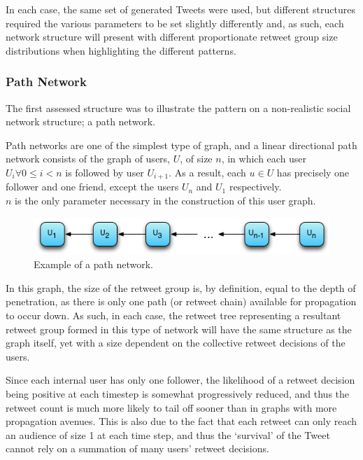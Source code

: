 In each case, the same set of generated Tweets were used, but different structures required the various parameters to be set slightly differently and, as such, each network structure will present with different proportionate retweet group size distributions when highlighting the different patterns.


\subsubsection{Path Network}
The first assessed structure was to illustrate the pattern on a non-realistic social network structure; a path network.

Path networks are one of the simplest type of graph, and a linear directional path network consists of the graph of users, $U$, of size $n$, in which each user $U_i \forall 0 \leq i < n$ is followed by user $U_{i+1}$. As a result, each $u \in U$ has precisely one follower and one friend, except the users $U_n$ and $U_1$ respectively.\\
$n$ is the only parameter necessary in the construction of this user graph.

\begin{figure}[h]
\centering
\includegraphics[scale=0.8]{4.Chapter2/Media/path_network.png} 
\caption{Example of a path network.}
\label{fig:path_network}
\end{figure}

In this graph, the size of the retweet group is, by definition, equal to the depth of penetration, as there is only one path (or retweet chain) available for propagation to occur down. As such, in each case, the retweet tree representing a resultant retweet group formed in this type of network will have the same structure as the graph itself, yet with a size dependent on the collective retweet decisions of the users.

Since each internal user has only one follower, the likelihood of a retweet decision being positive at each timestep is somewhat progressively reduced, and thus the retweet count is much more likely to tail off sooner than in graphs with more propagation avenues. This is also due to the fact that each retweet can only reach an audience of size 1 at each time step, and thus the `survival' of the Tweet cannot rely on a summation of many users' retweet decisions. 

